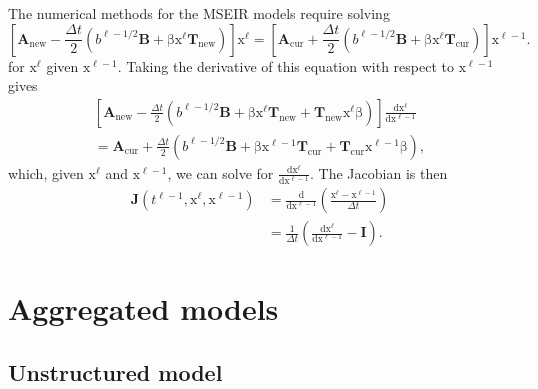 \documentclass[USenglish]{article}
\renewcommand{\vec}[1]{\boldsymbol{\mathrm{#1}}}
\newcommand{\mat}[1]{\mathbf{#1}}
\newcommand{\md}{\mathrm{d}}
\begin{document}
The numerical methods for the MSEIR models require solving
\begin{equation}
  \label{step}
  \left[
    \mat{A}_{\mathrm{new}}
    - \frac{\Delta t}{2} \left(
      b^{\ell - 1 / 2} \mat{B}
      + \vec{\beta} \vec{x}^{\ell} \mat{T}_{\mathrm{new}}
    \right)
  \right]
  \vec{x}^{\ell}
  =
  \left[
    \mat{A}_{\mathrm{cur}}
    + \frac{\Delta t}{2} \left(
      b^{\ell - 1 / 2} \mat{B}
      + \vec{\beta} \vec{x}^{\ell} \mat{T}_{\mathrm{cur}}
    \right)
  \right]
  \vec{x}^{\ell - 1}.
\end{equation}
for $\vec{x}^{\ell}$ given $\vec{x}^{\ell - 1}$.
Taking the derivative of this equation with respect to
$\vec{x}^{\ell - 1}$ gives
\begin{multline}
  \left[
    \mat{A}_{\mathrm{new}}
    - \frac{\Delta t}{2}
    \left(
      b^{\ell - 1 / 2} \mat{B}
      + \vec{\beta} \vec{x}^{\ell} \mat{T}_{\mathrm{new}}
      + \mat{T}_{\mathrm{new}} \vec{x}^{\ell} \vec{\beta}
    \right)
  \right]
  \frac{\md \vec{x}^{\ell}}{\md \vec{x}^{\ell - 1}}
  \\
  = \mat{A}_{\mathrm{cur}}
  + \frac{\Delta t}{2}
  \left(
    b^{\ell - 1 / 2} \mat{B}
    + \vec{\beta} \vec{x}^{\ell - 1} \mat{T}_{\mathrm{cur}}
    + \mat{T}_{\mathrm{cur}} \vec{x}^{\ell - 1} \vec{\beta}
  \right),
\end{multline}
which, given $\vec{x}^{\ell}$ and $\vec{x}^{\ell - 1}$,
we can solve for $\frac{\md \vec{x}^{\ell}}{\md \vec{x}^{\ell - 1}}$.
The Jacobian is then
\begin{equation}
  \begin{split}
    \mat{J}\left(t^{\ell - 1}, \vec{x}^{\ell}, \vec{x}^{\ell - 1}\right)
    &= \frac{\md}{\md \vec{x}^{\ell - 1}}
      \left(
      \frac{\vec{x}^{\ell} - \vec{x}^{\ell - 1}}{\Delta t}
      \right)
    \\
    &= \frac{1}{\Delta t} \left(
      \frac{\md \vec{x}^{\ell}}{\md \vec{x}^{\ell - 1}}
      - \mat{I}
      \right).
  \end{split}
\end{equation}


\section{Aggregated models}


\subsection{Unstructured model}
\end{document}
